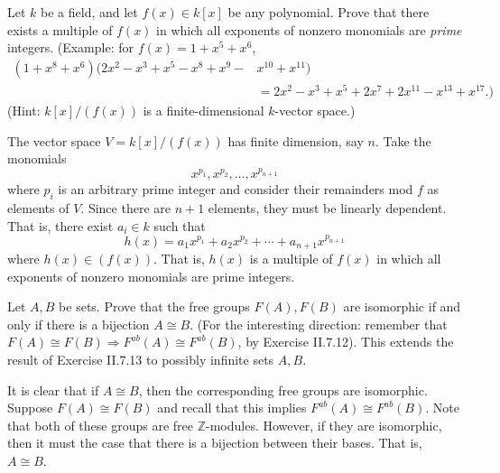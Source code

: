 \documentclass[../../master.tex]{subfiles}
\begin{document}
\begin{problem}
    Let $k$ be a field, and let $f(x) \in k[x]$ be any polynomial.
    Prove that there exists a multiple of $f(x)$ in which all exponents of nonzero monomials are \textit{prime} integers.
    (Example: for $f(x) = 1 + x^{5} + x^{6}$,
    \begin{align*}
        (1 + x^{8} + x^{6}) (2x^2 - x^{3} + x^{5} - x^{8} + x^{9} - &x^{10} + x^{11}) \\
                                                                    &= 2x^2 - x^3 + x^{5} + 2x^{7} + 2x^{11} - x^{13} + x^{17}.)
    \end{align*}
    (Hint: $k[x] / (f(x))$ is a finite-dimensional $k$-vector space.)
\end{problem}

\begin{solution}
    The vector space $V = k[x] / (f(x))$ has finite dimension, say $n$.
    Take the monomials
    \[
        x^{p_1}, x^{p_2}, \ldots, x ^{p_{n+1}}
    \]
    where $p_i$ is an arbitrary prime integer and consider their remainders mod $f$ as elements of $V$.
    Since there are $n+1$ elements, they must be linearly dependent.
    That is, there exist $a_i \in k$ such that
    \[
        h(x) = a_1 x^{p_1} + a_2 x^{p_2} + \cdots + a_{n+1} x^{p_{n+1}}
    \]
    where $h(x) \in (f(x))$.
    That is, $h(x)$ is a multiple of $f(x)$ in which all exponents of nonzero monomials are prime integers.
\end{solution}

\begin{problem}
    Let $A, B$ be sets.
    Prove that the free groups $F(A), F(B)$ are isomorphic if and only if there is a bijection $A \cong B$.
    (For the interesting direction: remember that $F(A) \cong F(B) \Longrightarrow F^{ab}(A) \cong F^{ab}(B)$, by Exercise II.7.12).
    This extends the result of Exercise II.7.13 to possibly infinite sets $A, B$.
\end{problem}

\begin{solution}
    It is clear that if $A \cong B$, then the corresponding free groups are isomorphic.
    Suppose $F(A) \cong F(B)$ and recall that this implies $F^{ab}(A) \cong F^{ab}(B)$.
    Note that both of these groups are free $\mathbb{Z}$-modules.
    However, if they are isomorphic, then it must the case that there is a bijection between their bases.
    That is, $A \cong B$.
\end{solution}
\end{document}
